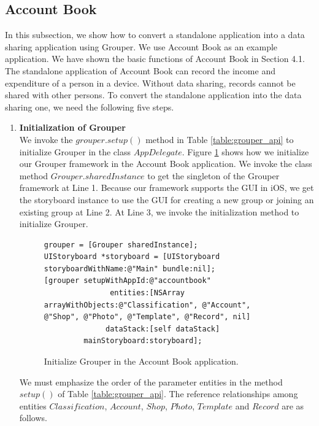 \documentclass[a4paper,11pt]{report}
\begin{document}
\subsection{Account Book}

In this subsection, we show how to convert a standalone application into a data sharing application using Grouper.
We use Account Book as an example application.
We have shown the basic functions of Account Book in Section 4.1.
The standalone application of Account Book can record the income and expenditure of a person in a device.
Without data sharing, records cannot be shared with other persons.
To convert the standalone application into the data sharing one, we need the following five steps.

\begin{enumerate}
\setlength{\itemsep}{1pt}
\setlength{\parskip}{0pt}
\setlength{\parsep}{0pt}
\item \textbf{Initialization of Grouper} \\

We invoke the $grouper.setup()$ method in Table \ref{table:grouper_api} to initialize Grouper in the class $AppDelegate$.
Figure \ref{fig:initialize_grouper} shows how we initialize our Grouper framework in the Account Book application.
We invoke the class method $Grouper.sharedInstance$ to get the singleton of the Grouper framework at Line 1.
Because our framework supports the GUI in iOS, we get the storyboard instance to use the GUI for creating a new group or joining an existing group at Line 2.
At Line 3, we invoke the initialization method to initialize Grouper.

\begin{figure}
\begin{lstlisting}[frame=none language=Objective-C] 
grouper = [Grouper sharedInstance];
UIStoryboard *storyboard = [UIStoryboard storyboardWithName:@"Main" bundle:nil];
[grouper setupWithAppId:@"accountbook"
               entities:[NSArray arrayWithObjects:@"Classification", @"Account", @"Shop", @"Photo", @"Template", @"Record", nil]
              dataStack:[self dataStack]
         mainStoryboard:storyboard];
\end{lstlisting}
\caption{Initialize Grouper in the Account Book application.}
\label{fig:initialize_grouper}
\end{figure}

We must emphasize the order of the parameter entities in the method $setup()$ of Table \ref{table:grouper_api}.
The reference relationships among entities $Classification$, $Account$, $Shop$, $Photo$, $Template$ and $Record$ are as follows.


\end{enumerate}
\end{document}
